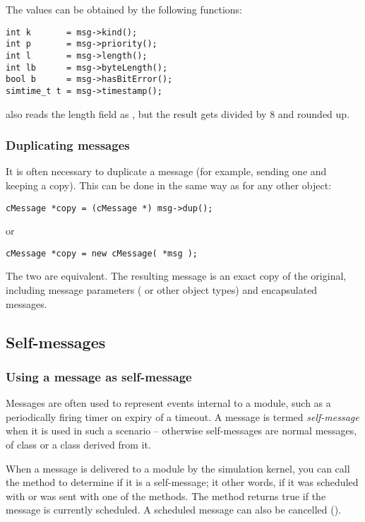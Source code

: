 The values can be obtained by the following functions:

\begin{verbatim}
int k       = msg->kind();
int p       = msg->priority();
int l       = msg->length();
int lb      = msg->byteLength();
bool b      = msg->hasBitError();
simtime_t t = msg->timestamp();
\end{verbatim}

 also reads the length field as ,
but the result gets divided by 8 and rounded up.


\subsubsection{Duplicating messages}

It is often necessary to duplicate a message (for example, sending
one and keeping a copy). This can be done in the same way as
for any other {\opp} object:

\begin{verbatim}
cMessage *copy = (cMessage *) msg->dup();
\end{verbatim}

or

\begin{verbatim}
cMessage *copy = new cMessage( *msg );
\end{verbatim}


The two are equivalent. The resulting message is an exact copy
of the original, including message parameters ( or other
object types) and encapsulated messages.


\subsection{Self-messages}

\subsubsection{Using a message as self-message}

Messages are often used to represent events internal to a module,
such as a periodically firing timer on expiry of a timeout.
A message is termed \textit{self-message} when it is used
in such a scenario -- otherwise self-messages are normal messages,
of class  or a class derived from it.

When a message is delivered to a module by the simulation kernel,
you can call the  method to determine if it is
a self-message; it other words, if it was scheduled with
 or was sent with one of the
 methods. The  method
returns true if the message is currently scheduled. A scheduled
message can also be cancelled ().

